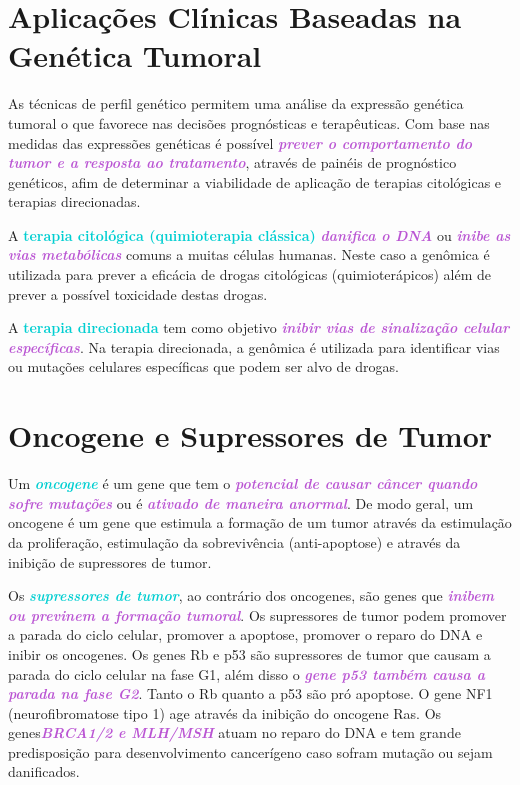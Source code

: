 \documentclass[11pt,a4paper]{article}
\begin{document}
\section{Aplicações Clínicas Baseadas na Genética Tumoral}

    As técnicas de perfil genético permitem uma análise da expressão genética tumoral o que favorece nas decisões prognósticas e terapêuticas. Com base nas medidas das expressões genéticas é possível \textcolor{MediumOrchid}{\textbf{\textit{prever o comportamento do tumor e a resposta ao tratamento}}}, através de painéis de prognóstico genéticos, afim de determinar a viabilidade de aplicação de terapias citológicas e terapias direcionadas.

    A \textbf{\textcolor{DarkTurquoise}{terapia citológica (quimioterapia clássica)}} \textcolor{MediumOrchid}{\textbf{\textit{danifica o DNA}}} ou \textcolor{MediumOrchid}{\textbf{\textit{inibe as vias metabólicas}}} comuns a muitas células humanas. Neste caso a genômica é utilizada para prever a eficácia de drogas citológicas (quimioterápicos) além de prever a possível toxicidade destas drogas.
    
    A \textbf{\textcolor{DarkTurquoise}{terapia direcionada}} tem como objetivo \textcolor{MediumOrchid}{\textbf{\textit{inibir vias de sinalização celular específicas}}}. Na terapia direcionada, a genômica é utilizada para identificar vias ou mutações celulares específicas que podem ser alvo de drogas. 

\section{Oncogene e Supressores de Tumor}

    Um \textcolor{DarkTurquoise}{\textbf{\textit{oncogene}}} é um gene que tem o \textcolor{MediumOrchid}{\textbf{\textit{potencial de causar câncer quando sofre mutações}}} ou é \textcolor{MediumOrchid}{\textbf{\textit{ativado de maneira anormal}}}. De modo geral, um oncogene é um gene que estimula a formação de um tumor através da estimulação da proliferação, estimulação da sobrevivência (anti-apoptose) e através da inibição de supressores de tumor. 

    Os \textcolor{DarkTurquoise}{\textbf{\textit{supressores de tumor}}}, ao contrário dos oncogenes, são genes que \textcolor{MediumOrchid}{\textbf{\textit{inibem ou previnem a formação tumoral}}}. Os supressores de tumor podem promover a parada do ciclo celular, promover a apoptose, promover o reparo do DNA e inibir os oncogenes. Os genes Rb e p53 são supressores de tumor que causam a parada do ciclo celular na fase G1, além disso o \textcolor{MediumOrchid}{\textbf{\textit{gene p53 também causa a parada na fase G2}}}. Tanto o Rb quanto a p53 são pró apoptose. O gene NF1 (neurofibromatose tipo 1) age através da inibição do oncogene Ras. Os genes\textcolor{MediumOrchid}{\textbf{\textit{BRCA1/2 e MLH/MSH}}} atuam no reparo do DNA e tem grande predisposição para desenvolvimento cancerígeno caso sofram mutação ou sejam danificados.
\end{document}
